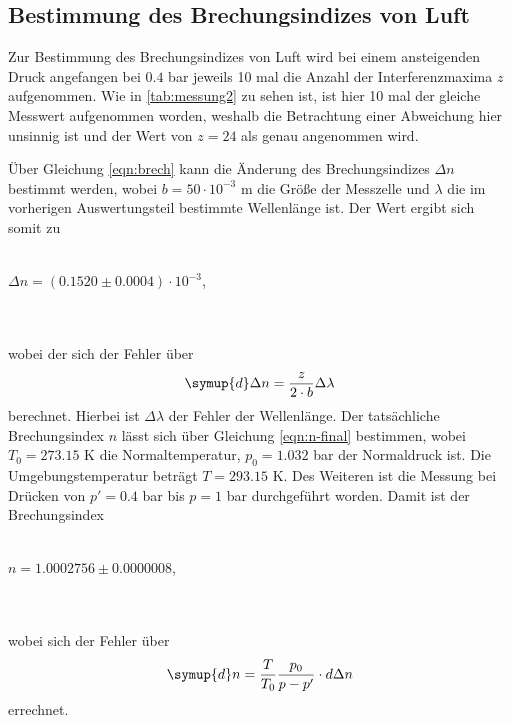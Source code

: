     \subsection{Bestimmung des Brechungsindizes von Luft}
            Zur Bestimmung des Brechungsindizes von Luft wird bei einem ansteigenden Druck angefangen bei $0.4$ bar jeweils 10 mal 
            die Anzahl der Interferenzmaxima $z$ aufgenommen. Wie in \autoref{tab:messung2} zu sehen ist, ist hier 10 mal der gleiche 
            Messwert aufgenommen worden, weshalb die Betrachtung einer Abweichung hier unsinnig ist und der Wert von $z = 24$ als genau 
            angenommen wird.
            
            Über Gleichung \eqref{eqn:brech} kann die Änderung des Brechungsindizes $\Delta n$ bestimmt werden, wobei
            $b = 50 \cdot 10^{-3}$ m die Größe der Messzelle und $\lambda$ die im vorherigen Auswertungsteil bestimmte Wellenlänge ist.
            Der Wert ergibt sich somit zu 
            \\ \\
            \centerline{$\Delta n = (0.1520 \pm 0.0004) \cdot 10^{-3}$,}
            \\ \\
            wobei der sich der Fehler über 
            \begin{equation}
               \symup{d} \Delta n = \frac{z}{2 \cdot b} \Delta \lambda
            \end{equation}
            berechnet. Hierbei ist $\Delta \lambda$ der Fehler der Wellenlänge.
            Der tatsächliche Brechungsindex $n$ lässt sich über Gleichung \eqref{eqn:n-final} bestimmen, wobei $T_0 = 273.15$ K die Normaltemperatur, $p_0 = 1.032$ bar 
            der Normaldruck ist. Die Umgebungstemperatur beträgt $T = 293.15$ K. Des Weiteren ist die Messung bei Drücken von $p' = 0.4$ bar
            bis $p = 1$ bar durchgeführt worden. Damit ist der Brechungsindex
            \\ \\
            \centerline{$n = 1.0002756 \pm 0.0000008$,}
            \\ \\
            wobei sich der Fehler über
            \begin{equation}
                \symup{d} n = \frac{T}{T_0} \frac{p_0}{p- p'} \cdot d \Delta n
            \end{equation}
            errechnet.    